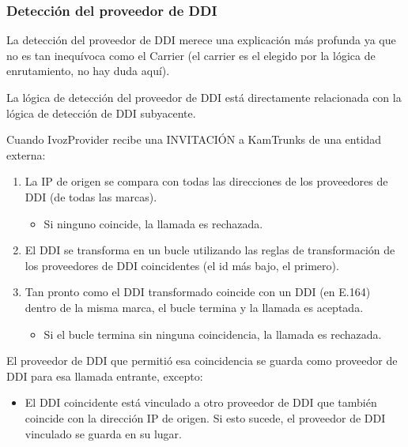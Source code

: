 \documentclass[letterpaper,10pt,spanish]{sphinxmanual}
\begin{document}
\subsubsection{Detección del proveedor de DDI}
\label{administration_portal/brand/calls/call_csv_schedulers:ddi-provider-detection}
La detección del proveedor de DDI merece una explicación más profunda ya que no es tan inequívoca como el Carrier (el carrier es el elegido por la lógica de enrutamiento, no hay duda aquí).

La lógica de detección del proveedor de DDI está directamente relacionada con la lógica de detección de DDI subyacente.

Cuando IvozProvider recibe una INVITACIÓN a KamTrunks de una entidad externa:
\begin{enumerate}
\item {} 
La IP de origen se compara con todas las direcciones de los proveedores de DDI (de todas las marcas).
\begin{itemize}
\item {} 
Si ninguno coincide, la llamada es rechazada.

\end{itemize}

\item {} 
El DDI se transforma en un bucle utilizando las reglas de transformación de los proveedores de DDI coincidentes (el id más bajo, el primero).

\item {} 
Tan pronto como el DDI transformado coincide con un DDI (en E.164) dentro de la misma marca, el bucle termina y la llamada es aceptada.
\begin{itemize}
\item {} 
Si el bucle termina sin ninguna coincidencia, la llamada es rechazada.

\end{itemize}

\end{enumerate}

El proveedor de DDI que permitió esa coincidencia se guarda como proveedor de DDI para esa llamada entrante, excepto:
\begin{itemize}
\item {} 
El DDI coincidente está vinculado a otro proveedor de DDI que también coincide con la dirección IP de origen. Si esto sucede, el proveedor de DDI vinculado se guarda en su lugar.

\end{itemize}
\end{document}
